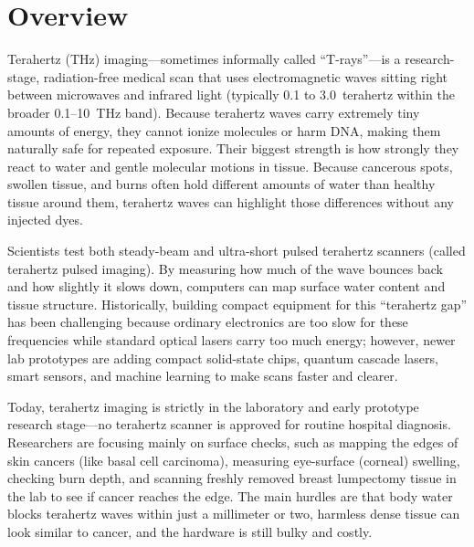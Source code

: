 \label{ch:infographic-terahertz-imaging}

\section{Overview}

Terahertz (THz) imaging---sometimes informally called ``T-rays''---is a research-stage, radiation-free medical scan that uses electromagnetic waves sitting right between microwaves and infrared light (typically 0.1 to 3.0~terahertz within the broader 0.1--10~THz band). Because terahertz waves carry extremely tiny amounts of energy, they cannot ionize molecules or harm DNA, making them naturally safe for repeated exposure. Their biggest strength is how strongly they react to water and gentle molecular motions in tissue. Because cancerous spots, swollen tissue, and burns often hold different amounts of water than healthy tissue around them, terahertz waves can highlight those differences without any injected dyes.

Scientists test both steady-beam and ultra-short pulsed terahertz scanners (called terahertz pulsed imaging). By measuring how much of the wave bounces back and how slightly it slows down, computers can map surface water content and tissue structure. Historically, building compact equipment for this ``terahertz gap'' has been challenging because ordinary electronics are too slow for these frequencies while standard optical lasers carry too much energy; however, newer lab prototypes are adding compact solid-state chips, quantum cascade lasers, smart sensors, and machine learning to make scans faster and clearer.

Today, terahertz imaging is strictly in the laboratory and early prototype research stage---no terahertz scanner is approved for routine hospital diagnosis. Researchers are focusing mainly on surface checks, such as mapping the edges of skin cancers (like basal cell carcinoma), measuring eye-surface (corneal) swelling, checking burn depth, and scanning freshly removed breast lumpectomy tissue in the lab to see if cancer reaches the edge. The main hurdles are that body water blocks terahertz waves within just a millimeter or two, harmless dense tissue can look similar to cancer, and the hardware is still bulky and costly.

